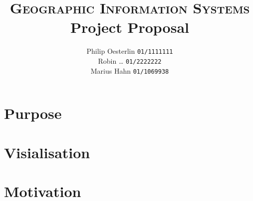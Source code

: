\documentclass{scrartcl}
\title{\textsc{Geographic Information Systems} \\ 
        Project Proposal}
\author{ 
    Philip Oesterlin 
    \texttt{01/1111111} \\
    Robin … 
    \texttt{01/2222222} \\
    Marius Hahn 
    \texttt{01/1069938}
       }
\begin{document}
\maketitle
\newpage
\section{Purpose}
\section{Visialisation}
\section{Motivation}
\end{document}
